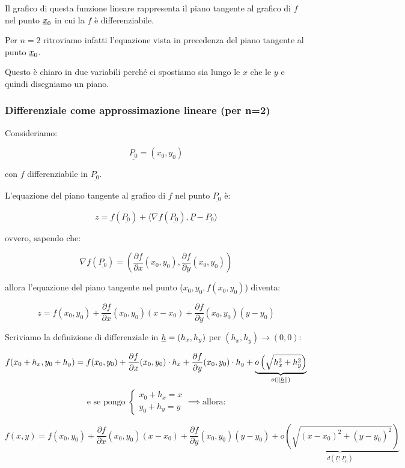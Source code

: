 Il grafico di questa funzione lineare rappresenta il piano tangente al grafico di \(f\) nel punto \(\underline{x}_0\) in cui la \(f\) è differenziabile.

Per \(n=2\) ritroviamo infatti l'equazione vista in precedenza del piano tangente al punto \(\underline{x}_0\).

Questo è chiaro in due variabili perché ci spostiamo sia lungo le \(x\) che le \(y\) e quindi disegniamo un piano.

\pagebreak
\subsubsection{Differenziale come approssimazione lineare (per n=2)}

Consideriamo:

\[
    \underline{P_0} = (x_0,y_0)
\]

con \(f\) differenziabile in \(\underline{P_0}\).

L'equazione del piano tangente al grafico di \(f\) nel punto \(\underline{P_0}\) è:

\[
    z= f(\underline{P_0}) + \langle \nabla f(\underline{P_0}), \underline{P}-\underline{P_0} \rangle
\]

ovvero, sapendo che:

\[
    \nabla f(\underline{P_0}) = \left( \frac{\partial f}{\partial x}(x_0,y_0), \frac{\partial f}{\partial y}(x_0,y_0) \right)
\]

allora l'equazione del piano tangente nel punto (\(x_0,y_0,f(x_0,y_0)\)) diventa:

\[
    z = f(x_0,y_0) + \frac{\partial f}{\partial x}(x_0,y_0) (x-x_0) + \frac{\partial f}{\partial y}(x_0,y_0) (y-y_0)
\]

Scriviamo la definizione di differenziale in \(\underline{h}=(h_x,h_y)\) per \((h_x,h_y) \rightarrow (0,0)\):

\[
    f(x_0+h_x,y_0+h_y) = f(x_0,y_0) + \frac{\partial f}{\partial x}(x_0,y_0) \cdot h_x + \frac{\partial f}{\partial y}(x_0,y_0) \cdot h_y + \underbrace{ o\left( \sqrt{h_x^{2}+h_y^{2}} \right)}_{o(\left\lVert\underline{h}\right\rVert)}
\]
\begin{equation*}
    \text{e se pongo }
    \begin{cases}
        x_0 + h_x = x \\
        y_0 + h_y = y
    \end{cases}
    \implies \text{allora:}
\end{equation*}

\[
    f(x,y) = f(x_0,y_0) + \frac{\partial f}{\partial x}(x_0,y_0) (x-x_0) + \frac{\partial f}{\partial y}(x_0,y_0) (y-y_0) + \underbrace{o\left( \sqrt{{(x-x_0)}^{2}+{(y-y_0)}^{2}} \right)}_\text{\(d(\underline{P},\underline{P}_0)\)}
\]

